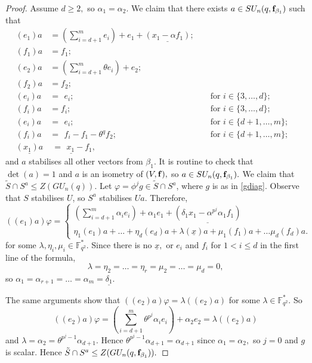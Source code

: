 \begin{proof}
Assume $d\ge 2,$ so $\alpha_1=\alpha_2.$ We claim that there exists  $a \in SU_n(q, {\bf f}_{\beta_1})$ such that 
\begingroup
\allowdisplaybreaks
\begin{align*}
(e_1)a & =  (\sum_{i=d+1}^m e_i)+ e_1  + \underline{(x_1-\alpha f_1)}; \\ (f_1)a & =  f_1; & \\
(e_{2})a & =    (\sum_{i=d+1}^m \theta e_i) + e_{2}; \\ (f_{2})a & =  f_{2}; & \\
(e_i)a & =  \phantom{(} e_i; & & \text{ for } i \in \{3, \ldots, d\}; \\  (f_i)a & =  f_i; & & \text{ for } i \in \{3, \ldots, d\}; \\
(e_i)a & =  \phantom{(} e_i; & & \text{ for }  i \in \{d+1, \ldots, m\};\\ (f_i)a & =  \phantom{(} f_i -f_1-\theta^q f_2; & & \text{ for }  i \in \{d+1, \ldots, m\};\\
\underline{(x_1)a} & \underline{\; =\phantom{(} x_1-f_1}, & & & 
\end{align*} 
\endgroup
and $a$ stabilises all other vectors from $\beta_1.$ It is routine to check that $\det(a)=1$ and $a$ is an isometry of $(V, {\bf f}),$ so $a \in SU_n(q,{\bf f}_{\beta_1}).$ We claim that $\tilde{S} \cap S^a \le Z(GU_n(q)).$ Let $\varphi= \phi^jg \in \tilde{S} \cap S^a$, where $g$ is as in \eqref{gdiag}. Observe that $S$ stabilises  $U$, so $S^a$ stabilises $Ua.$ Therefore, 
\begin{equation*}
((e_1)a)\varphi=
\begin{cases}
(\sum_{i=d+1}^m \alpha_i e_i)+ \alpha_1 e_1 + \underline{(\delta_1 x_1-\alpha^{p^j} \alpha_1 f_1)}\\
\eta_1 (e_1)a+ \ldots +\eta_{d}(e_{d})a + \lambda (\underline{x})a+ \mu_1(f_1)a+ \ldots \mu_d(f_d)a.
\end{cases}
\end{equation*}
 for some $\lambda, \eta_i, \mu_i \in \mathbb{F}_{q^2}^*.$ 
Since there is no $\underline{x},$ or $e_i$ and $f_i$ for $1<i\le d$ in  the first line of the formula, $$\lambda=\eta_2 =\ldots =\eta_r=\mu_2= \ldots=\mu_d=0,$$
so $\alpha_1=\alpha_{r+1}= \ldots= \alpha_{m}=\underline{\delta_1}.$

The same arguments show that $((e_2)a)\varphi=\lambda((e_2)a)$ for some $\lambda \in \mathbb{F}_{q^2}^*.$ So $$((e_2)a)\varphi=(\sum_{i=d+1}^m \theta^{p^j} \alpha_i e_i)+ \alpha_2 e_2=\lambda((e_2)a)$$
and $\lambda=\alpha_2= \theta^{p^j-1}\alpha_{d+1}.$ 
Hence $\theta^{p^j-1}\alpha_{d+1}=\alpha_{d+1}$ since $\alpha_1=\alpha_2,$ so $j=0$ and $g$ is scalar.
 Hence $\tilde{S} \cap S^a\le Z(GU_n(q,{\bf f}_{\beta_1})).$


\end{proof}
